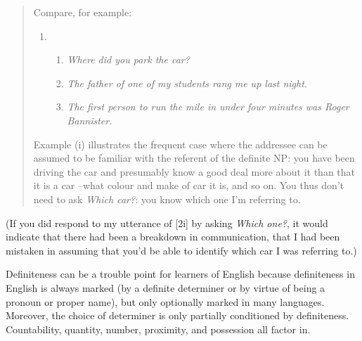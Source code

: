 \begin{quote}
    Compare, for example:
    \begin{enumerate}
        \item 
        \begin{enumerate}
            \item \textit{Where did you park the car?}
            \item \textit{The father of one of my students rang me up last night.}
            \item \textit{The first person to run the mile in under four minutes was Roger Bannister.}
        \end{enumerate}
    \end{enumerate}
    Example (i) illustrates the frequent case where the addressee can be assumed to be familiar with the referent of the definite NP: you have been driving the car and presumably know a good deal more about it than that it is a car --what colour and make of car it is, and so on. You thus don't need to ask \textit{Which car?}: you know which one I'm referring to. \\\hfill\citep[368]{Huddleston2002}
\end{quote}

\noindent(If you did respond to my utterance of [2i] by asking \textit{Which one?}, it would indicate that there had been a breakdown in communication, that I had been mistaken in assuming that you'd be able to identify which car I was referring to.)

Definiteness can be a trouble point for learners of English because definiteness in English is always marked (by a definite determiner or by virtue of being a pronoun or proper name), but only optionally marked in many languages. Moreover, the choice of determiner is only partially conditioned by definiteness. Countability, quantity, number, proximity, and possession all factor in.

